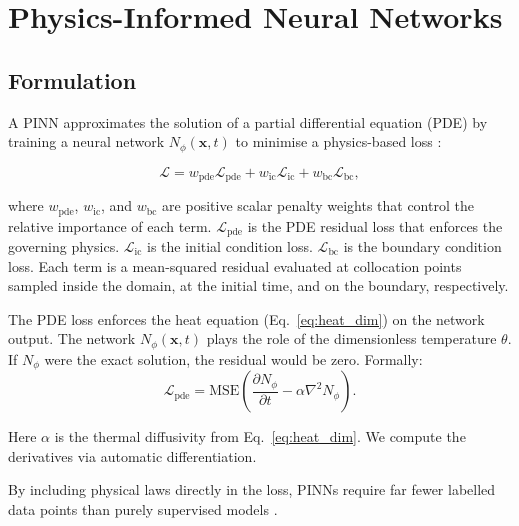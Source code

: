 \section{Physics-Informed Neural Networks}
\label{sec:pinn_theory}

\subsection{Formulation}

A PINN approximates the solution of a partial differential equation (PDE)
by training a neural network $N_\phi(\mathbf{x},t)$ to minimise a
physics-based loss \cite{raissi2019}:

\begin{equation}
\mathcal{L} = w_\mathrm{pde}\mathcal{L}_\mathrm{pde}
            + w_\mathrm{ic}\mathcal{L}_\mathrm{ic}
            + w_\mathrm{bc}\mathcal{L}_\mathrm{bc},
\label{eq:pinn_loss}
\end{equation}

where $w_\mathrm{pde}$, $w_\mathrm{ic}$, and $w_\mathrm{bc}$ are positive
scalar penalty weights that control the relative importance of each term.
$\mathcal{L}_\mathrm{pde}$ is the PDE residual loss that enforces the
governing physics.
$\mathcal{L}_\mathrm{ic}$ is the initial condition loss.
$\mathcal{L}_\mathrm{bc}$ is the boundary condition loss.
Each term is a mean-squared residual evaluated at collocation points sampled
inside the domain, at the initial time, and on the boundary, respectively.

The PDE loss enforces the heat equation (Eq.~\eqref{eq:heat_dim}) on the
network output.
The network $N_\phi(\mathbf{x},t)$ plays the role of the dimensionless
temperature $\theta$.
If $N_\phi$ were the exact solution, the residual would be zero.
Formally:
\begin{equation}
\mathcal{L}_\mathrm{pde}
= \mathrm{MSE}\!\left(\frac{\partial N_\phi}{\partial t}
  - \alpha\nabla^2 N_\phi\right).
\label{eq:lpde}
\end{equation}

Here $\alpha$ is the thermal diffusivity from Eq.~\eqref{eq:heat_dim}.
We compute the derivatives via automatic differentiation.

By including physical laws directly in the loss, PINNs require far fewer
labelled data points than purely supervised models
\cite{karniadakis2021,cuomo2022}.

